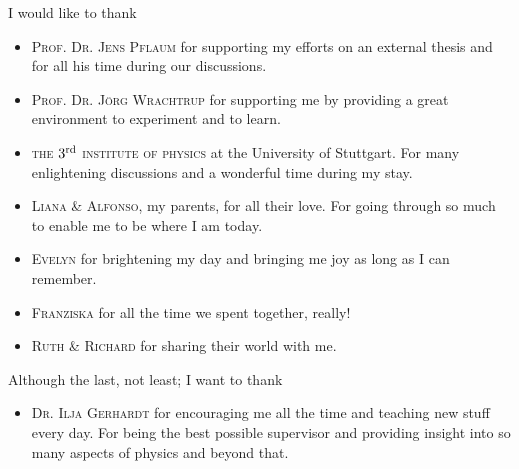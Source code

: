 \newpage

I would like to thank

\begin{itemize}

\item[\ding{78}]\textsc{Prof. Dr. Jens Pflaum} for supporting my efforts on an external thesis and
		for all his time during our discussions.

\item[\ding{78}]\textsc{Prof. Dr. Jörg Wrachtrup} for supporting me by providing a great
		environment to experiment and to learn.

\item[\ding{78}]\textsc{the $3^{\rm{rd}}$ institute of physics} at the University of Stuttgart. 
		For many enlightening discussions and a wonderful time during my stay.
		
\item[\ding{78}]\textsc{Liana \& Alfonso}, my parents, for all their love. For going through so 
		much to enable me to be where I am today.
		
\item[\ding{78}]\textsc{Evelyn} for brightening my day and bringing me joy as long as I can 
		remember.
		
\item[\ding{78}]\textsc{Franziska} for all the time we spent together, really!

\item[\ding{78}]\textsc{Ruth \& Richard} for sharing their world with me.

\end{itemize}

Although the last, not least; I want to thank

\begin{itemize}

\item[\ding{78}] \textsc{Dr. Ilja Gerhardt} for encouraging me all the time and teaching new stuff 
		every day. For being the best possible supervisor and providing insight into so many aspects 
		of physics and beyond that.

\end{itemize}

\newpage
